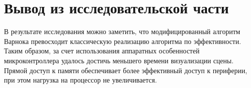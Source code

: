 \section{Вывод из исследовательской части}
В результате исследования можно заметить, что модифицированный алгоритм Варнока превосходит классическую реализацию алгоритма по эффективности. Таким образом, за счет использования аппаратных особенностей микроконтроллера удалось достичь меньшего времени визуализации сцены. Прямой доступ к памяти обеспечивает более эффективный доступ к периферии, при этом нагрузка на процессор не увеличивается.
